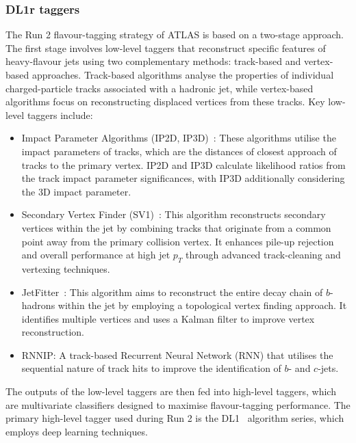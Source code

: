         \subsubsection{DL1r taggers}
            The Run 2 flavour-tagging strategy of ATLAS is based on a two-stage approach. The first stage involves low-level taggers that reconstruct specific 
            features of heavy-flavour jets using two complementary methods: track-based and vertex-based approaches. Track-based algorithms analyse the 
            properties of individual charged-particle tracks associated with a hadronic jet, while vertex-based algorithms focus on reconstructing displaced 
            vertices from these tracks. Key low-level taggers include:
            \begin{itemize}
                \item Impact Parameter Algorithms (IP2D, IP3D)~\cite{ATL-PHYS-PUB-2017-013}: These algorithms utilise the impact parameters of tracks, which are the distances of 
                closest approach of tracks to the primary vertex. IP2D and IP3D calculate likelihood ratios from the track impact parameter significances, 
                with IP3D additionally considering the 3D impact parameter.
                \item Secondary Vertex Finder (SV1)~\cite{ATL-PHYS-PUB-2017-011}: This algorithm reconstructs secondary vertices within the jet by combining tracks that originate 
                from a common point away from the primary collision vertex. It enhances pile-up rejection and overall performance at high jet \( p_T \) through 
                advanced track-cleaning and vertexing techniques.
                \item JetFitter~\cite{ATL-PHYS-PUB-2018-025}: This algorithm aims to reconstruct the entire decay chain of \(b\)-hadrons within the jet by employing a topological 
                vertex finding approach. It identifies multiple vertices and uses a Kalman filter to improve vertex reconstruction.
                \item RNNIP: A track-based Recurrent Neural Network (RNN) that utilises the sequential nature of track hits to improve the identification 
                of \(b\)- and \(c\)-jets.
            \end{itemize}
            The outputs of the low-level taggers are then fed into high-level taggers, which are multivariate classifiers designed to maximise 
            flavour-tagging performance. The primary high-level tagger used during Run 2 is the DL1~\cite{ATL-PHYS-PUB-2017-013} algorithm series, which employs deep learning techniques.
